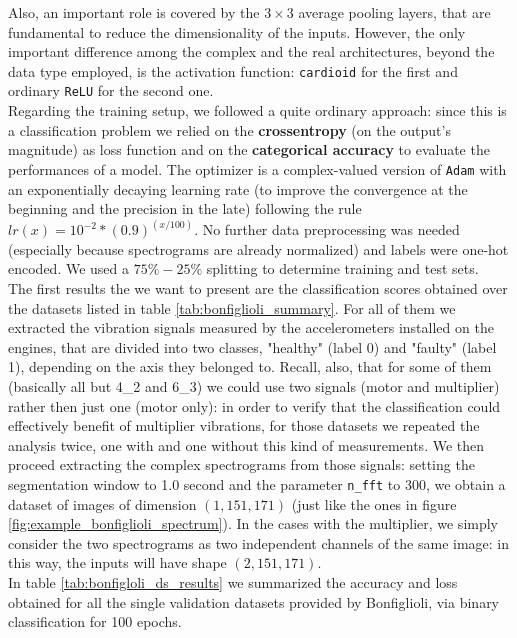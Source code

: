 \documentclass[../main.tex]{subfiles}
\begin{document}
Also, an important role is covered by the $3\times 3$ average pooling layers, that are fundamental to reduce the dimensionality of the inputs. However, the only important difference among the complex and the real architectures, beyond the data type employed, is the activation function: \texttt{cardioid} for the first and ordinary \texttt{ReLU} for the second one.\\
Regarding the training setup, we followed a quite ordinary approach: since this is a classification problem we relied on the \textbf{crossentropy} (on the output's magnitude) as loss function and on the \textbf{categorical accuracy} to evaluate the performances of a model. The optimizer is a complex-valued version of \texttt{Adam} with an exponentially decaying learning rate (to improve the convergence at the beginning and the precision in the late) following the rule $lr(x) = 10^{-2}*(0.9)^{(x/100)}$. No further data preprocessing was needed (especially because spectrograms are already normalized) and labels were one-hot encoded. We used a $75\%-25\%$ splitting to determine training and test sets.\\
The first results the we want to present are the classification scores obtained over the datasets listed in table \ref{tab:bonfiglioli_summary}. For all of them we extracted the vibration signals measured by the accelerometers installed on the engines, that are divided into two classes, "healthy" (label 0) and "faulty" (label 1), depending on the axis they belonged to. Recall, also, that for some of them (basically all but 4\_2 and 6\_3) we could use two signals (motor and multiplier) rather then just one (motor only): in order to verify that the classification could effectively benefit of multiplier vibrations, for those datasets we repeated the analysis twice, one with and one without this kind of measurements. We then proceed extracting the complex spectrograms from those signals: setting the segmentation window to 1.0 second and the parameter \texttt{n\_fft} to 300, we obtain a dataset of images of dimension $(1,151,171)$ (just like the ones in figure \ref{fig:example_bonfiglioli_spectrum}). In the cases with the multiplier, we simply consider the two spectrograms as two independent channels of the same image: in this way, the inputs will have shape $(2,151,171)$.\\
In table \ref{tab:bonfigloli_ds_results} we summarized the accuracy and loss obtained for all the single validation datasets provided by Bonfiglioli, via binary classification for 100 epochs.
\end{document}
